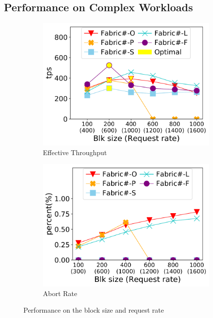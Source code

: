 \subsection{Performance on Complex Workloads}
\label{ch:txn:exp:complex}
\begin{figure}[t]
	\centering
    \begin{subfigure}{0.45\textwidth}
      \includegraphics[width=0.99\textwidth]{chart/txn/complex_blksize_thruput.pdf}
      \caption{Effective Throughput}
      \label{chart:txn:blksize:thruput}
    \end{subfigure}
    \begin{subfigure}{0.45\textwidth}
      \includegraphics[width=0.99\textwidth]{chart/txn/complex_blksize_abort.pdf}
      \caption{Abort Rate}
      \label{chart:txn:blksize:abort}
    \end{subfigure}
    \caption{Performance on the block size and request rate}
    \label{chart:txn:blksize}
\end{figure}

